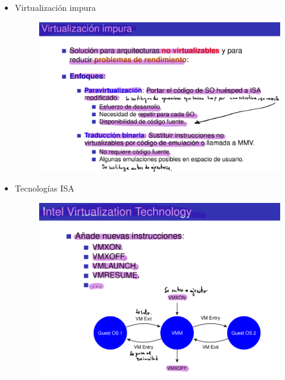 \documentclass[12pt, twoside, openright]{report} %
\begin{document}
  \begin{itemize}
  \item
    Virtualización impura
    \begin{figure}[H]
      {\includegraphics[scale=.4]{Untitled 39.png}}
    \end{figure}
  \item
    Tecnologías ISA
    \begin{figure}[H]
      {\includegraphics[scale=.4]{Untitled 40.png}}
    \end{figure}
    \begin{figure}[H]

\end{figure}
\end{itemize}
\end{document}
